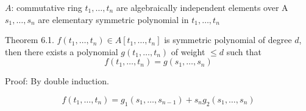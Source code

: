 $A$: commutative ring
$t_1, \dots, t_n$ are algebraically independent elements over A
$s_1, \dots, s_n$ are elementary symmetric polynomial in $t_1, \dots, t_n$

Theorem 6.1.
$f(t_1, \dots, t_n) \in A[t_1, \dots, t_n]$ is symmetric polynomial of degree $d$,
then there exists a polynomial $g(t_1, \dots, t_n)$ of weight $\le d$ such that
$$
f(t_1, \dots, t_n) = g(s_1, \dots, s_n)
$$

Proof: By double induction.

$$
f(t_1, \dots, t_n) = g_1(s_1, \dots, s_{n-1}) + s_n g_2(s_1, \dots, s_n)
$$
